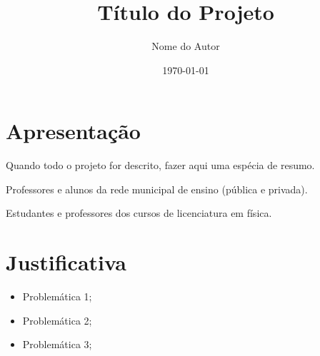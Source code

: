 \documentclass[12pt]{article}
\title{Título do Projeto}
\author{Nome do Autor}
\affil{Nome do Curso}
\date{\today}
\begin{document}
	
\maketitle
	













\section{Apresentação}

Quando todo o projeto for descrito, fazer aqui uma espécia de resumo.





\begin{description}[leftmargin=0.0ex]

\item[Comunidade externa beneficiada]
Professores e alunos da rede municipal de ensino (pública e privada).

\item[Comunidade interna beneficiada]
Estudantes e professores dos cursos de licenciatura em física.

\end{description}











\section{Justificativa}


\begin{itemize}[leftmargin=0.0ex,itemsep=0pt,parsep=0pt,partopsep=0pt] 
\item Problemática 1;
\item Problemática 2;
\item Problemática 3;
\end{itemize}
\end{document}
